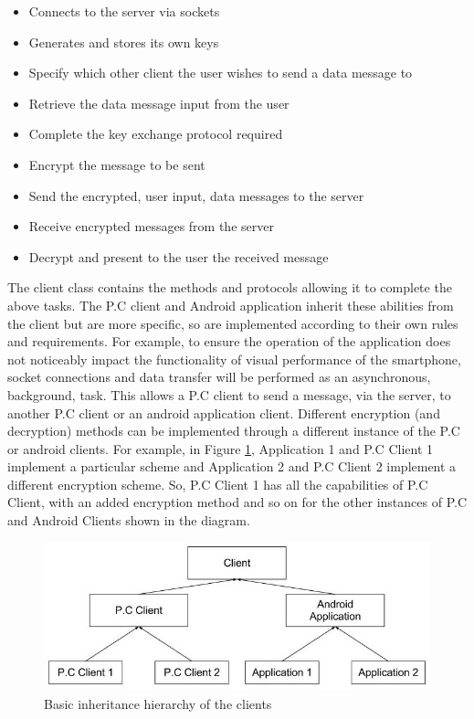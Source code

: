\documentclass[a4paper,10pt]{report}
\begin{document}
\begin{itemize}
 \item Connects to the server via sockets
 \item Generates and stores its own keys
 \item Specify which other client the user wishes to send a data message to
 \item Retrieve the data message input from the user
 \item Complete the key exchange protocol required
 \item Encrypt the message to be sent
 \item Send the encrypted, user input, data messages to the server
 \item Receive encrypted messages from the server
 \item Decrypt and present to the user the received message
\end{itemize}

The client class contains the methods and protocols allowing it to complete the above tasks. The P.C client and Android application inherit these abilities from the client but are more specific, so are implemented according to their own rules and requirements. For example, to ensure the operation of the application does not noticeably impact the functionality of visual performance of the smartphone, socket connections and data transfer will be performed as an asynchronous, background, task. This allows a P.C client to send a message, via the server, to another P.C client or an android application client. Different encryption (and decryption) methods can be implemented through a different instance of the P.C or android clients. For example, in Figure \ref{fig:clienthier}, Application 1 and P.C Client 1 implement a particular scheme and Application 2 and P.C Client 2 implement a different encryption scheme. So, P.C Client 1 has all the capabilities of P.C Client, with an added encryption method and so on for the other instances of P.C and Android Clients shown in the diagram. 

\begin{figure}[htb]
\centering
\includegraphics[scale=0.4]{images/designs2.jpg}
\caption{Basic inheritance hierarchy of the clients}
\label{fig:clienthier}
\end{figure}
\end{document}
